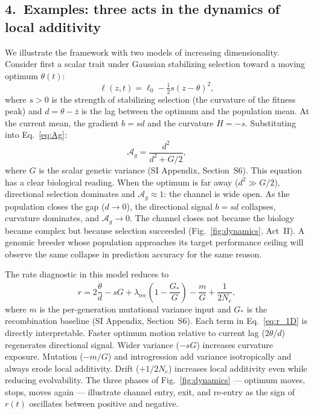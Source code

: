 \documentclass[9pt,twocolumn,twoside]{pnas-new}
\newcommand{\Ag}{\mathcal{A}_{g}}
\begin{document}
\subsection*{4.~Examples: three acts in the dynamics of
             local additivity}


We illustrate the framework with two models of increasing
dimensionality.
Consider first a scalar trait under Gaussian stabilizing selection
toward a moving optimum $\theta(t)$:
\begin{equation}
\ell(z,t)
= \ell_0 - \tfrac{1}{2}s(z - \theta)^2,
\label{eq:landscape_1D}
\end{equation}
where $s > 0$ is the strength of stabilizing selection (the
curvature of the fitness peak) and $d = \theta - \bar{z}$ is the
lag between the optimum and the population mean.
At the current mean, the gradient $b = sd$ and the curvature
$H = -s$.
Substituting into Eq.~\eqref{eq:Ag}:
\begin{equation}
\Ag = \frac{d^2}{d^2 + G/2},
\label{eq:Ag_1D}
\end{equation}
where $G$ is the scalar genetic variance (SI Appendix, Section~S6).
This equation has a clear biological reading.
When the optimum is far away ($d^2 \gg G/2$), directional selection
dominates and $\Ag \approx 1$: the channel is wide open.
As the population closes the gap ($d \to 0$), the directional
signal $b = sd$ collapses, curvature dominates, and $\Ag \to 0$.
The channel closes not because the biology became complex but
because selection succeeded (Fig.~\ref{fig:dynamics}, Act~II).
A genomic breeder whose population approaches its target performance
ceiling will observe the same collapse in prediction accuracy for
the same reason.

The rate diagnostic in this model reduces to
\begin{equation}
r
= 2\frac{\dot{\theta}}{d}
  - sG
  + \lambda_{\mathrm{rec}}\!\left(1 - \frac{G_*}{G}\right)
  - \frac{m}{G}
  + \frac{1}{2N_e},
\label{eq:r_1D}
\end{equation}
where $m$ is the per-generation mutational variance input and
$G_*$ is the recombination baseline (SI Appendix, Section~S6).
Each term in Eq.~\eqref{eq:r_1D} is directly interpretable.
Faster optimum motion relative to current lag ($2\dot{\theta}/d$)
regenerates directional signal.
Wider variance ($-sG$) increases curvature exposure.
Mutation ($-m/G$) and introgression add variance isotropically
and always erode local additivity.
Drift ($+1/2N_e$) increases local additivity even while reducing
evolvability.
The three phases of Fig.~\ref{fig:dynamics} --- optimum moves,
stops, moves again --- illustrate channel entry, exit, and
re-entry as the sign of $r(t)$ oscillates between positive and
negative.
\end{document}
